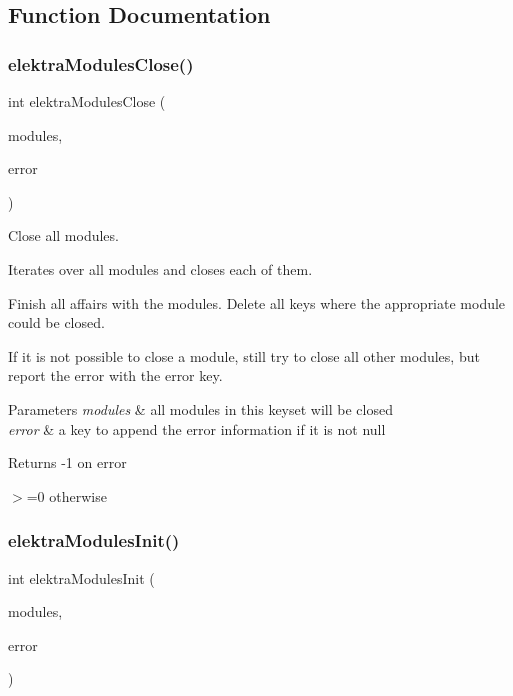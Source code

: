 \subsection{Function Documentation}
\mbox{\label{group__modules_ga5646d92ffe3e1e04c4586d9c910ba6bd}} 
\subsubsection{\texorpdfstring{elektra\+Modules\+Close()}{elektraModulesClose()}}
{\footnotesize\ttfamily int elektra\+Modules\+Close (\begin{DoxyParamCaption}\item[{Key\+Set $\ast$}]{modules,  }\item[{Key $\ast$}]{error }\end{DoxyParamCaption})}



Close all modules. 

Iterates over all modules and closes each of them.

Finish all affairs with the modules. Delete all keys where the appropriate module could be closed.

If it is not possible to close a module, still try to close all other modules, but report the error with the error key.


\begin{DoxyParams}{Parameters}
{\em modules} & all modules in this keyset will be closed \\
\hline
{\em error} & a key to append the error information if it is not null \\
\hline
\end{DoxyParams}
\begin{DoxyReturn}{Returns}
-\/1 on error 

$>$=0 otherwise 
\end{DoxyReturn}
\mbox{\label{group__modules_gaa40915e67f973ccd5258aa450bd03585}} 
\subsubsection{\texorpdfstring{elektra\+Modules\+Init()}{elektraModulesInit()}}
{\footnotesize\ttfamily int elektra\+Modules\+Init (\begin{DoxyParamCaption}\item[{Key\+Set $\ast$}]{modules,  }\item[{Key $\ast$}]{error }\end{DoxyParamCaption})}



